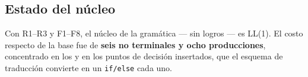 \subsection{Estado del núcleo}

Con R1--R3 y F1--F8, el núcleo de la gramática --- sin logros --- es LL(1). El costo
respecto de la base fue de \textbf{seis no terminales y ocho producciones}, concentrado en los
 y en los puntos de decisión insertados, que el esquema de traducción convierte en
un \texttt{if/else} cada uno.
